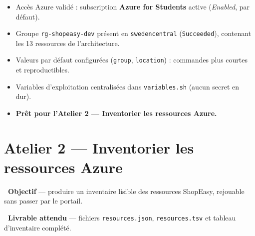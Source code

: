 \documentclass[11pt,a4paper]{article}
\newcommand{\emo}[1]{\raisebox{-0.14em}{\twemoji{#1}}}
\newcommand{\eTarget}{\emo{1f3af}}
\newcommand{\ePackage}{\emo{1f4e6}}
\newcommand{\code}[1]{\texttt{#1}}
\begin{document}
\begin{etatbox}
\begin{itemize}
  \item Accès Azure validé : subscription \textbf{Azure for Students} active (\textit{Enabled}, par défaut).
  \item Groupe \code{rg-shopeasy-dev} présent en \code{swedencentral} (\code{Succeeded}), contenant les 13 ressources de l'architecture.
  \item Valeurs par défaut configurées (\code{group}, \code{location}) : commandes plus courtes et reproductibles.
  \item Variables d'exploitation centralisées dans \code{variables.sh} (aucun secret en dur).
  \item \textbf{Prêt pour l'Atelier 2 — Inventorier les ressources Azure.}
\end{itemize}
\end{etatbox}


\section{Atelier 2 — Inventorier les ressources Azure}

\begin{fiche}
\textbf{\eTarget~Objectif} — produire un inventaire lisible des ressources ShopEasy, rejouable sans passer par le portail.

\textbf{\ePackage~Livrable attendu} — fichiers \code{resources.json}, \code{resources.tsv} et tableau d'inventaire complété.
\end{fiche}
\end{document}
